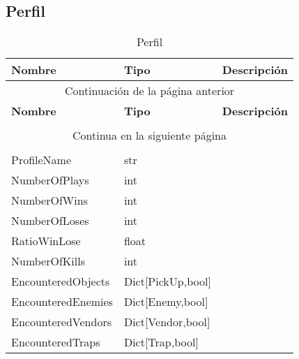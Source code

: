 \subsection{Perfil}

\begin{longtable}[H]{
    @{}
    l
    l
    l
    @{}
    }%

    \toprule        %
    \textbf{Nombre} & \textbf{Tipo} & \textbf{Descripción} \\      %
    \midrule        %
    \endfirsthead   %

    \multicolumn{3}{c}{Continuación de la página anterior}\\
    \toprule
    \textbf{Nombre} & \textbf{Tipo} & \textbf{Descripción} \\\\      %
    \midrule        %
    \endhead        %

    \midrule
    \multicolumn{3}{c}{Continua en la siguiente página}\\ %
    \endfoot        %

    \bottomrule
    \caption{Perfil \label{tab:entidad_perfil}} \\
    \endlastfoot    %

    ProfileName         & str                    & \\
    NumberOfPlays       & int                    & \\
    NumberOfWins        & int                    & \\
    NumberOfLoses       & int                    & \\
    RatioWinLose        & float                  & \\
    NumberOfKills       & int                    & \\
    EncounteredObjects  & Dict[PickUp,bool] & \\
    EncounteredEnemies  & Dict[Enemy,bool]       & \\
    EncounteredVendors  & Dict[Vendor,bool]      & \\
    EncounteredTraps    & Dict[Trap,bool]        & \\
\end{longtable}
